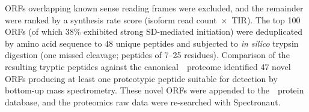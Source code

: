 ORFs overlapping known sense reading frames were excluded, and the remainder were ranked by a synthesis rate score (isoform read count~$\times$~TIR).
The top 100 ORFs (of which 38\% exhibited strong SD-mediated initiation) were deduplicated by amino acid sequence to 48 unique peptides and subjected to \textit{in silico} trypsin digestion (one missed cleavage; peptides of 7--25 residues).
Comparison of the resulting tryptic peptides against the canonical~\syn~proteome identified 47 novel ORFs producing at least one proteotypic peptide suitable for detection by bottom-up mass spectrometry.
These novel ORFs were appended to the~\syn~protein database, and the proteomics raw data were re-searched with Spectronaut.